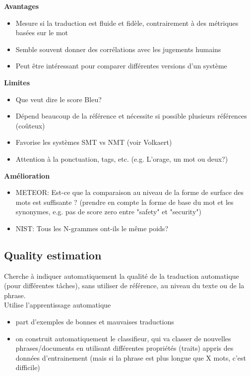 \textbf{Avantages}

\begin{itemize}
    \item Mesure si la traduction est fluide et fidèle, contrairement à des métriques basées sur le mot
    \item Semble souvent donner des corrélations avec les jugements humains
    \item Peut être intéressant pour comparer différentes versions d'un système\\
\end{itemize}

\textbf{Limites}

\begin{itemize}
    \item Que veut dire le score Bleu?
    \item Dépend beaucoup de la référence et nécessite si possible plusieurs références (coûteux)
    \item Favorise les systèmes SMT vs NMT (voir Volkaert)
    \item Attention à la ponctuation, tags, etc. (e.g. L'orage, un mot ou deux?)\\
\end{itemize}

\textbf{Amélioration}

\begin{itemize}
    \item METEOR: Est-ce que la comparaison au niveau de la forme de surface des mots est suffisante ? (prendre en compte la forme de base du mot et les synonymes, e.g. pas de score zero entre "safety" et "security")
    \item NIST: Tous les N-grammes ont-ils le même poids?\\
\end{itemize}

\subsection{Quality estimation}

Cherche à indiquer automatiquement la qualité de la traduction automatique (pour différentes tâches), sans utiliser de référence, au niveau du texte ou de la phrase.\\

Utilise l'apprentissage automatique

\begin{itemize}
    \item part d'exemples de bonnes et mauvaises traductions
    \item on construit automatiquement le classifieur, qui va classer de nouvelles phrases/documents en utilisant différentes propriétés (traits) appris des données d'entrainement (mais si la phrase est plus longue que X mots, c'est difficile)\\
\end{itemize}

